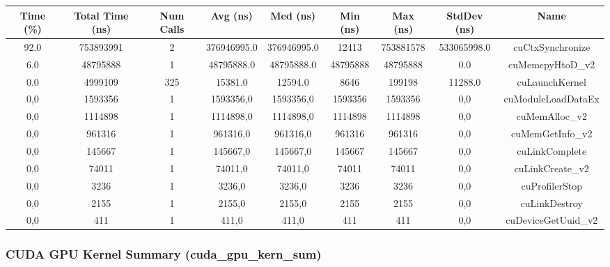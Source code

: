 \documentclass[a4paper, 12pt, oneside]{article}
\begin{document}
\begin{center}
  \begin{adjustbox}{width=1\textwidth}
    \begin{tabular}{ |c|c|c|c|c|c|c|c|c| }
      \hline
      Time (\%) & Total Time (ns) & Num Calls & Avg (ns)    & Med (ns)    & Min (ns) & Max (ns)  & StdDev (ns) & Name                \\
      \hline
      92.0      & 753893991       & 2         & 376946995.0 & 376946995.0 & 12413    & 753881578 & 533065998.0 & cuCtxSynchronize    \\
      6.0       & 48795888        & 1         & 48795888.0  & 48795888.0  & 48795888 & 48795888  & 0.0         & cuMemcpyHtoD\_v2    \\
      0.0       & 4999109         & 325       & 15381.0     & 12594.0     & 8646     & 199198    & 11288.0     & cuLaunchKernel      \\
      0,0       & 1593356         & 1         & 1593356,0   & 1593356,0   & 1593356  & 1593356   & 0,0         & cuModuleLoadDataEx  \\
      0,0       & 1114898         & 1         & 1114898,0   & 1114898,0   & 1114898  & 1114898   & 0,0         & cuMemAlloc\_v2      \\
      0,0       & 961316          & 1         & 961316,0    & 961316,0    & 961316   & 961316    & 0,0         & cuMemGetInfo\_v2    \\
      0,0       & 145667          & 1         & 145667,0    & 145667,0    & 145667   & 145667    & 0,0         & cuLinkComplete      \\
      0,0       & 74011           & 1         & 74011,0     & 74011,0     & 74011    & 74011     & 0,0         & cuLinkCreate\_v2    \\
      0,0       & 3236            & 1         & 3236,0      & 3236,0      & 3236     & 3236      & 0,0         & cuProfilerStop      \\
      0,0       & 2155            & 1         & 2155,0      & 2155,0      & 2155     & 2155      & 0,0         & cuLinkDestroy       \\
      0,0       & 411             & 1         & 411,0       & 411,0       & 411      & 411       & 0,0         & cuDeviceGetUuid\_v2 \\
      \hline
    \end{tabular}
  \end{adjustbox}
\end{center}

\subsubsection{CUDA GPU Kernel Summary (cuda\_gpu\_kern\_sum)}
\end{document}
